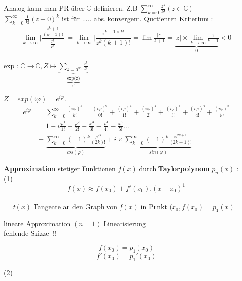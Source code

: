 \begin{remark}
Analog kann man PR über $\mathbb{C}$ definieren.
Z.B $\sum_{k=0}^{\infty}{\frac{z^k}{k!}}(z \in \mathbb{C})$ 
$\sum_{k=0}^{\infty}{\frac{1}{k!}(z-0)^k}$ ist für ..... abs. konvergent.
Quotienten Kriterium : 
\begin{align*}
\lim_{k \to \infty}{\bigg| \dfrac{\frac{z^k+1}{(k+1)!}}{\frac{z^k}{k!}}\bigg|} = \lim_{k \to \infty}{\bigg|\dfrac{z^{k+1 \times k!}}{z^k(k+1)!}} = \lim{\frac{|z|}{k+1}} = \underbrace{|z|\times \lim_{k \to \infty}{\frac{1}{k+1}}}_{0}<0
\end{align*} 

exp : $\mathbb{C} \rightarrow \mathbb{C} , Z \longmapsto  \underbrace{\sum_{k=0^{\infty}}{\frac{z^k}{k!}}}_{\underbrace{\text{exp(z)}}_{e^z}}$

$Z = exp(i \varphi)= e ^{i \varphi}$.
\begin{align*}
e ^{i \varphi} &= \sum_{k=0}^{\infty}{\frac{(i \varphi)^k}{k!}} = \frac{(i \varphi)^0}{0!} + \frac{(i \varphi)^1}{1!} + \frac{(i \varphi)^2}{2!} + \frac{(i \varphi)^3}{3!} + \frac{(i \varphi)^4}{4!} + \frac{(i \varphi)^5}{5!}\\
 &= 1 +  i \frac{\varphi^1}{1!} - \frac{\varphi^2}{2!} - \frac{\varphi^3}{3!} - \frac{\varphi^4}{4!} - \frac{\varphi^5}{5!} \dots \\
 &= \underbrace{\sum_{k=0}^{\infty}{(-1)^k \frac{\varphi^{2k}}{(2k)!}}}_{cos(\varphi)} + i \times \underbrace{\sum_{k=0}^{\infty}{(-1)^k \frac{\varphi^{2k+1}}{(2k+1)!}}}_{sin(\varphi)}
\end{align*}
\end{remark}
\textbf{Approximation} stetiger Funktionen $f(x)$ durch \textbf{Taylorpolynom} $p_n(x)$ :\\
(1) \\
$$f(x) \approx f(x_0)+f'(x_0).(x-x_0)^1$$\\
$= t(x)$ Tangente an den Graph von $f(x)$ in Punkt $(x_0 , f(x_0) = p_1(x)$
 
lineare Approximation $(n=1)$
Linearisierung\\
fehlende Skizze !!! 

\begin{remark}
\[ f(x_0)= p_1(x_0) \]
\[ f'(x_0)= p_1'(x_0) \]
\end{remark}
(2) 